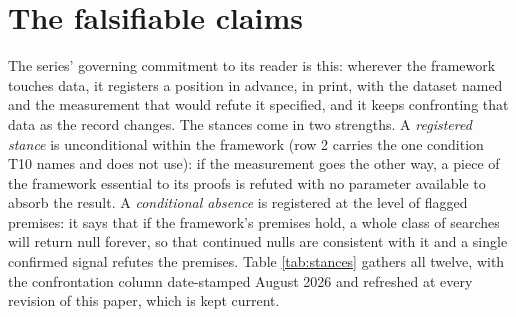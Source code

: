 \documentclass[11pt]{article}
\theoremstyle{definition}
\begin{document}
\section{The falsifiable claims}\label{sec:ledger}

The series' governing commitment to its reader is this: wherever the framework touches data, it registers a position in advance, in print, with the dataset named and the measurement that would refute it specified, and it keeps confronting that data as the record changes. The stances come in two strengths. A \emph{registered stance} is unconditional within the framework (row 2 carries the one condition T10 names and does not use): if the measurement goes the other way, a piece of the framework essential to its proofs is refuted with no parameter available to absorb the result. A \emph{conditional absence} is registered at the level of flagged premises: it says that if the framework's premises hold, a whole class of searches will return null forever, so that continued nulls are consistent with it and a single confirmed signal refutes the premises. Table \ref{tab:stances} gathers all twelve, with the confrontation column date-stamped August 2026 and refreshed at every revision of this paper, which is kept current.
\end{document}
